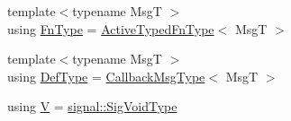 \begin{DoxyCompactItemize}
\item 
{\footnotesize template$<$typename MsgT $>$ }\\using \hyperlink{structvt_1_1pipe_1_1_pipe_manager_t_l_ac2c474a68a93bbc8e1d86eb99dabf1dc}{Fn\+Type} = \hyperlink{namespacevt_a54eefd5373739c7365058b0d22fea6e2}{Active\+Typed\+Fn\+Type}$<$ MsgT $>$
\item 
{\footnotesize template$<$typename MsgT $>$ }\\using \hyperlink{structvt_1_1pipe_1_1_pipe_manager_t_l_a5f78dde989930cf645a8bd67301740a7}{Def\+Type} = \hyperlink{structvt_1_1pipe_1_1_pipe_manager_t_l_af6fc2c17f1729fa06450441b0ee81cb1}{Callback\+Msg\+Type}$<$ MsgT $>$
\item 
using \hyperlink{structvt_1_1pipe_1_1_pipe_manager_t_l_a8d394521df58abfd90c1d81c998f22e3}{V} = \hyperlink{namespacevt_1_1pipe_1_1signal_acbe257d1ae44f20fa9fd9b6ed3057caf}{signal\+::\+Sig\+Void\+Type}
\end{DoxyCompactItemize}
